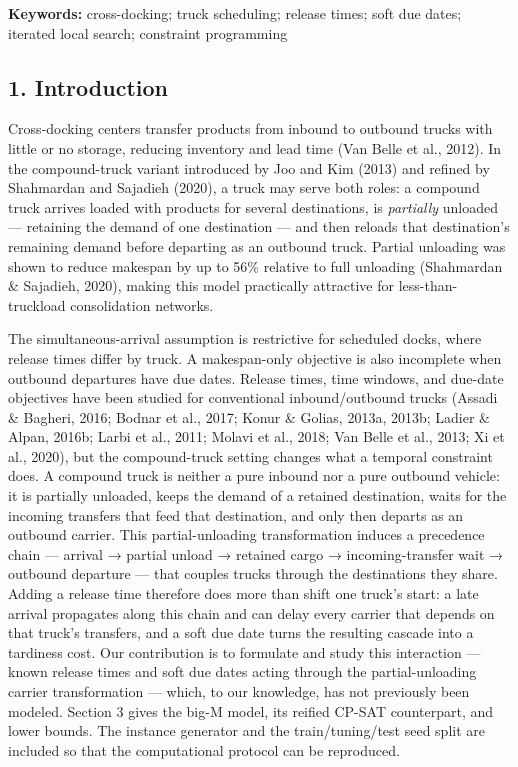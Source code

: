 \documentclass[
]{article}
\begin{document}
\textbf{Keywords:} cross-docking; truck scheduling; release times; soft
due dates; iterated local search; constraint programming

\subsection{1. Introduction}\label{introduction}

Cross-docking centers transfer products from inbound to outbound trucks
with little or no storage, reducing inventory and lead time (Van Belle
et al., 2012). In the compound-truck variant introduced by Joo and Kim
(2013) and refined by Shahmardan and Sajadieh (2020), a truck may serve
both roles: a compound truck arrives loaded with products for several
destinations, is \emph{partially} unloaded --- retaining the demand of
one destination --- and then reloads that destination's remaining demand
before departing as an outbound truck. Partial unloading was shown to
reduce makespan by up to 56\% relative to full unloading (Shahmardan \&
Sajadieh, 2020), making this model practically attractive for
less-than-truckload consolidation networks.

The simultaneous-arrival assumption is restrictive for scheduled docks,
where release times differ by truck. A makespan-only objective is also
incomplete when outbound departures have due dates. Release times, time
windows, and due-date objectives have been studied for conventional
inbound/outbound trucks (Assadi \& Bagheri, 2016; Bodnar et al., 2017;
Konur \& Golias, 2013a, 2013b; Ladier \& Alpan, 2016b; Larbi et al.,
2011; Molavi et al., 2018; Van Belle et al., 2013; Xi et al., 2020), but
the compound-truck setting changes what a temporal constraint does. A
compound truck is neither a pure inbound nor a pure outbound vehicle: it
is partially unloaded, keeps the demand of a retained destination, waits
for the incoming transfers that feed that destination, and only then
departs as an outbound carrier. This partial-unloading transformation
induces a precedence chain --- arrival → partial unload → retained cargo
→ incoming-transfer wait → outbound departure --- that couples trucks
through the destinations they share. Adding a release time therefore
does more than shift one truck's start: a late arrival propagates along
this chain and can delay every carrier that depends on that truck's
transfers, and a soft due date turns the resulting cascade into a
tardiness cost. Our contribution is to formulate and study this
interaction --- known release times and soft due dates acting through
the partial-unloading carrier transformation --- which, to our
knowledge, has not previously been modeled. Section 3 gives the big-M
model, its reified CP-SAT counterpart, and lower bounds. The instance
generator and the train/tuning/test seed split are included so that the
computational protocol can be reproduced.
\end{document}
